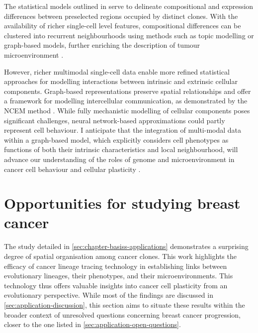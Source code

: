The statistical models outlined in  serve to delineate compositional and expression differences between preselected regions occupied by distinct clones. With the availability of richer single-cell level features, compositional differences can be clustered into recurrent neighbourhoods using methods such as topic modelling or graph-based models, further enriching the description of tumour microenvironment \parencite{Danenberg2022-zb, Jackson2020-em, Nirmal2022-sq, Schurch2020-lp, Wang2023-bo}.


However, richer multimodal single-cell data enable more refined statistical approaches for modelling interactions between intrinsic and extrinsic cellular components. Graph-based representations preserve spatial relationships and offer a framework for modelling intercellular communication, as demonstrated by the NCEM method \parencite{Fischer2023-go}. While fully mechanistic modelling of cellular components poses significant challenges, neural network-based approximations could partly represent cell behaviour. I anticipate that the integration of multi-modal data within a graph-based model, which explicitly considers cell phenotypes as functions of both their intrinsic characteristics and local neighbourhood, will advance our understanding of the roles of genome and microenvironment in cancer cell behaviour and cellular plasticity .

\section{Opportunities for studying breast cancer}

The study detailed in \cref{sec:chapter-basiss-applications} demonstrates a surprising degree of spatial organisation among cancer clones. This work highlights the efficacy of cancer lineage tracing technology in establishing links between evolutionary lineages, their phenotypes, and their microenvironments. This technology thus offers valuable insights into cancer cell plasticity from an evolutionary perspective. While most of the findings are discussed in \cref{sec:application-discussion}, this section aims to situate these results within the broader context of unresolved questions concerning breast cancer progression, closer to the one listed in \cref{sec:application-open-questions}.

